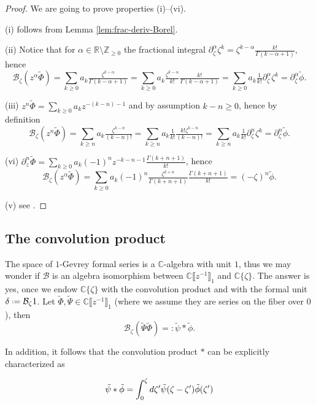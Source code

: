 \documentclass{article}
\theoremstyle{definition}
\newcommand{\Z}{\mathbb{Z}}
\newcommand{\R}{\mathbb{R}}
\newcommand{\C}{\mathbb{C}}
\newcommand*{\defeq}{\mathrel{\vcenter{\baselineskip0.5ex \lineskiplimit0pt
                     \hbox{\scriptsize.}\hbox{\scriptsize.}}}%
                     =}
\newcommand{\borel}{\mathcal{B}}
\theoremstyle{plain}
\begin{document}
\begin{proof} 

We are going to prove properties (i)--(vi). 

(i) follows from Lemma \ref{lem:frac-deriv-Borel}. 

(ii) Notice that for $\alpha\in\R\setminus\Z_{\geq 0}$ the fractional integral $\partial_\zeta^{\alpha}\zeta^{k}=\zeta^{k-\alpha}\tfrac{k!}{\Gamma(k-\alpha+1)}$, hence \[\borel_\zeta (z^\alpha \tilde{\Phi})=\sum_{k\geq 0}a_k\tfrac{\zeta^{k-\alpha}}{\Gamma(k-\alpha+1)}=\sum_{k\geq 0}a_k\tfrac{\zeta^{k-\alpha}}{k!}\tfrac{k!}{\Gamma(k-\alpha+1)}=\sum_{k\geq 0}a_k \tfrac{1}{k!}\partial_\zeta^{\alpha}\zeta^k=\partial_\zeta^\alpha\tilde{\phi}.\]

(iii) $z^n\tilde{\Phi}=\sum_{k\geq 0}a_kz^{-(k-n)-1} $ and by assumption $k-n\geq 0$, hence by definition \[\borel_\zeta (z^n \tilde{\Phi})=\sum_{k\geq n} a_k\tfrac{\zeta^{k-n}}{(k-n)!}=\sum_{k\geq n} a_k\tfrac{1}{k!}\tfrac{k!\zeta^{k-n}}{(k-n)!}=\sum_{k\geq n} a_k\tfrac{1}{k!}\partial_\zeta^n\zeta^k=\partial_\zeta^n\tilde{\phi}.\] 

(vi) $\partial_z^n \tilde{\Phi}=\sum_{k\geq 0}a_k(-1)^{n}z^{-k-n-1}\tfrac{\Gamma(k+n+1)}{k!}$, hence \[\borel_\zeta (z^\alpha \tilde{\Phi})=\sum_{k\geq 0}a_k(-1)^{n}\tfrac{\zeta^{k+n}}{\Gamma(k+n+1)}\tfrac{\Gamma(k+n+1)}{k!}=(-\zeta)^{n}\tilde{\phi}.\]

(v) see \cite[Lemma 5.10]{diverg-resurg-i}. 

\end{proof}

\subsection{The convolution product}\label{convolution}

The space of $1$-Gevrey formal series is a $\C$-algebra with unit $1$, thus we may wonder if $\borel$ is an algebra isomorphism between $\C\llbracket z^{-1}\rrbracket_1$ and $\C\lbrace\zeta\rbrace$. The answer is yes, once we endow $\C\lbrace\zeta\rbrace$ with the convolution product and with the formal unit $\delta\defeq\borel_\zeta 1$. Let $\tilde{\Phi}, \tilde{\Psi}\in \C \llbracket z^{-1} \rrbracket_1$ (where we assume they are series on the fiber over $0$), then 
\[\borel_\zeta(\tilde{\Psi}\tilde{\Phi})=:\tilde{\psi}\ast\tilde{\phi}.\]

In addition, it follows that the convolution product $\ast$ can be explicitly characterized as 

\begin{equation}
    \tilde{\psi}\ast\Tilde{\phi}=\int_0^{\zeta}d\zeta' \tilde{\psi}(\zeta-\zeta')\tilde{\phi}(\zeta')
\end{equation}
\end{document}

